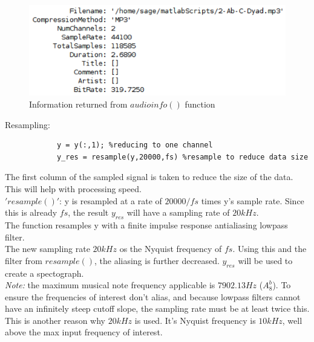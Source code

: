 \documentclass[12pt,a4paper]{article}
\begin{document}
		\begin{figure}[H]
			\includegraphics[width=0.7\linewidth]{audioinfo}
			\caption{Information returned from $audioinfo()$ function}
		\end{figure}
		Resampling\cite{Resample}:\\
		\begin{lstlisting}
			y = y(:,1); %reducing to one channel
			y_res = resample(y,20000,fs) %resample to reduce data size
		\end{lstlisting}
		The first column of the sampled signal is taken to reduce the size of the data. This will help
		with processing speed.\\
		$'resample()'$: y is resampled at a rate of $20000/fs$ times y's sample rate. Since this is 
		already $fs$, the result $y_{res}$ will have a sampling rate of $20kHz$.\\
		The function resamples y with a finite impulse response antialiasing lowpass filter.\\
		The new sampling rate $20kHz$ os the Nyquist frequency of $fs$. Using this and the filter from
		$resample()$, the aliasing is further decreased. $y_{res}$ will be used to create a spectograph.\\
		\emph{Note:} the maximum musical note frequency applicable is $7902.13Hz$ ($A^b_8$)\cite{NoteReference}. To ensure
		the frequencies of interest don't alias, and because lowpass filters cannot have an infinitely steep
		cutoff slope, the sampling rate must be at least twice this. This is another reason why $20kHz$ is
		used. \vspace*{5mm} It's Nyquist frequency is $10kHz$, well above the max input frequency of interest.\\
\end{document}
